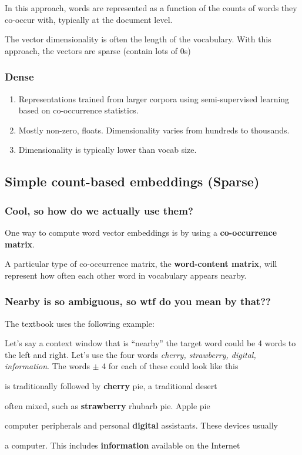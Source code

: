\documentclass[11pt]{article}
\begin{document}
In this approach, words are represented as a function of the counts of words
they co-occur with, typically at the document level.

The vector dimensionality is often the length of the vocabulary. With this
approach, the vectors are sparse (contain lots of 0s)

\subsubsection{Dense}

\begin{enumerate}
	\item Representations trained from larger corpora using semi-supervised
	      learning based on co-occurrence statistics.
	\item Mostly non-zero, floats. Dimensionality varies from hundreds to
	      thousands.
	\item Dimensionality is typically lower than vocab size.
\end{enumerate}

\subsection{Simple count-based embeddings (Sparse)}


\subsubsection*{Cool, so how do we actually use them?}

One way to compute word vector embeddings is by using a \textbf{co-occurrence
	matrix}.

A particular type of co-occurrence matrix, the \textbf{word-content matrix},
will represent how often each other word in vocabulary appears nearby.

\subsubsection*{Nearby is so ambiguous, so wtf do you mean by that??}

The textbook uses the following example:

Let's say a context window that is ``nearby'' the target word could be 4 words
to the left and right. Let's use the four words \textit{cherry, strawberry,
	digital, information}. The words $\pm$ 4 for each of these could look like
this

\begin{center}
	is traditionally followed by \textbf{cherry} pie, a traditional
	desert

	often mixed, such as \textbf{strawberry} rhubarb pie. Apple pie

	computer peripherals and personal \textbf{digital} assistants. These devices
	usually

	a computer. This includes \textbf{information} available on the Internet
\end{center}
\end{document}
